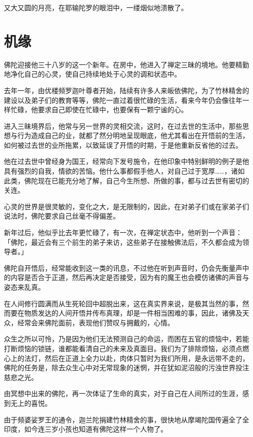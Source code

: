 \documentclass[twoside,openany]{book}
\begin{document}
又大又圆的月亮，在耶输陀罗的眼泪中，一缕烟似地溃散了。

\section{机缘}\label{sec3.14}

佛陀迎接他三十八岁的这一个新年。在房中，他进入了禅定三昧的境地。他要精勤地净化自己的心灵，使自己持续地处于心灵的调和状态中。

去年一年，由优楼频罗迦叶尊者开始，陆续有许多人来皈依佛陀，为了竹林精舍的建设以及弟子们的教育等等，佛陀一直过着很忙碌的生活，看来今年仍会像往年一样忙碌，他要求自己即使在忙碌中，也要保有一颗宁谧的心。

进入三昧境界后，他常与另一世界的灵相交流，这时，在过去世的生活中，那些思想与行为造成自己的业，就都了然分明地呈现眼底，他尤其看出在开悟前的生活，如何被过去世的业所拖累，以致延误了开悟的时期，于是他重新反省他的过去。

他在过去世中曾经身为国王，经常向下发号施令，在他印象中特别鲜明的例子是他具有强烈的自我，情欲的苦恼。他什么事都假手他人，对自己过于宽厚……，诸如此类，佛陀现在已能充分地了解，自己今生所想、所做的事，都与过去世有密切的关连。

心灵的世界是很灵敏的，变化之大，是无限制的，因此，在对弟子们或在家弟子们说法时，佛陀要求自己丝毫不得偏差。

新年过后，他似乎比去年更忙碌了，有一次，在禅定状态中，他听到一个声音：「佛陀，最近会有三个前生的弟子来访，这些弟子在接触佛法后，不久都会成为领导者。」

佛陀自开悟后，经常能收到这一类的讯息，不过他在听到声音时，仍会先衡量声中的内容是否合于正道，然后再决定是否接受，因为有的魔王也会模仿诸佛的声音与姿态来乱真。

在人间修行圆满而从生死轮回中超脱出来，这在真实界来说，是极其当然的事，然而要在物质发达的人间开悟并传布真理，却是一件相当困难的事，因此，诸佛及天众，经常会来佛陀面前，表现他们赞叹与拥戴的，心情。

众生之所以可怜，乃是因为他们无法预测自己的命运，而困在五官的烦恼中，若能打断烦恼的锁链，谁都能看清自己的未来及真面目。我们为了排除烦恼，必须点燃心上的法灯，然后在正道上全力以赴，肉体只暂时为我们所用，是永远带不走的，佛陀的任务是，除去众生心中对无常现象的迷惘，并在犹如泥沼般的污浊世界投注慈悲之光。

由冥想中出来的佛陀，再一次体证了生命的真实，对于自己在人间所过的生涯，感到无上的喜悦。

由于频婆娑罗王的通令，迦兰陀捐建竹林精舍的事，很快地从摩竭陀国传遍全了全印度，如今连三岁小孩也知道有佛陀这样一个人物了。
\end{document}
